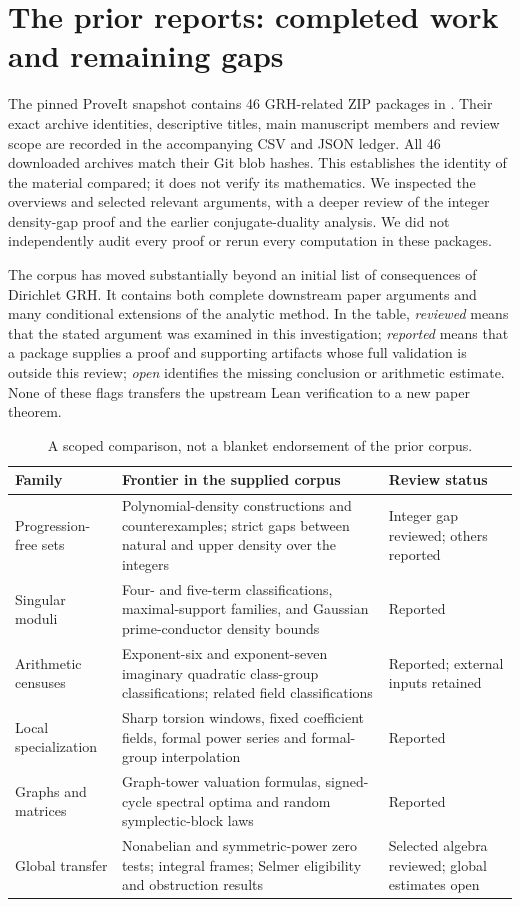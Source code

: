 \section{The prior reports: completed work and remaining gaps}
\label{sec:prior-landscape}

The pinned ProveIt snapshot contains 46 GRH-related ZIP packages in
. Their exact archive identities, descriptive titles,
main manuscript members and review scope are recorded in the accompanying
CSV and JSON ledger. All 46 downloaded archives match their Git blob hashes.
This establishes the identity of the material compared; it does not verify
its mathematics. We inspected the overviews and selected relevant arguments,
with a deeper review of the integer density-gap proof and the earlier
conjugate-duality analysis. We did not independently audit every proof or
rerun every computation in these packages.\cite{priorinventory}

The corpus has moved substantially beyond an initial list of consequences
of Dirichlet GRH. It contains both complete downstream paper arguments and
many conditional extensions of the analytic method. In the table,
\emph{reviewed} means that the stated argument was examined in this
investigation; \emph{reported} means that a package supplies a proof and
supporting artifacts whose full validation is outside this review;
\emph{open} identifies the missing conclusion or arithmetic estimate.
None of these flags transfers the upstream Lean verification to a new
paper theorem.

\begin{table}[htbp]
\centering\small
\begin{tabularx}{\linewidth}{@{}p{.19\linewidth}X p{.15\linewidth}@{}}
\toprule
Family & Frontier in the supplied corpus & Review status\\
\midrule
Progression-free sets & Polynomial-density constructions and counterexamples;
strict gaps between natural and upper density over the integers & Integer
gap reviewed; others reported\\[3pt]
Singular moduli & Four- and five-term classifications, maximal-support
families, and Gaussian prime-conductor density bounds & Reported\\[3pt]
Arithmetic censuses & Exponent-six and exponent-seven imaginary quadratic
class-group classifications; related field classifications & Reported;
external inputs retained\\[3pt]
Local specialization & Sharp torsion windows, fixed coefficient fields,
formal power series and formal-group interpolation & Reported\\[3pt]
Graphs and matrices & Graph-tower valuation formulas, signed-cycle spectral
optima and random symplectic-block laws & Reported\\[3pt]
Global transfer & Nonabelian and symmetric-power zero tests; integral
frames; Selmer eligibility and obstruction results & Selected algebra
reviewed; global estimates open\\
\bottomrule
\end{tabularx}
\caption{A scoped comparison, not a blanket endorsement of the prior corpus.}
\label{tab:prior-families}
\end{table}

